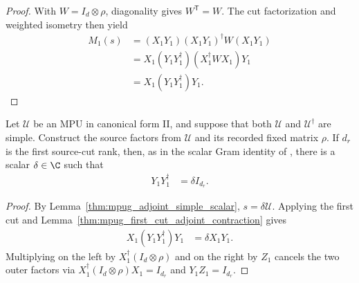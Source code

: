 \begin{proof}\leanok
    With $W=I_d\otimes\rho$, diagonality gives $W^{\mathsf T}=W$.
    The cut factorization and weighted isometry then yield
    \begin{align}
        M_1(s)
         & = (X_1Y_1)(X_1Y_1)^\dagger W(X_1Y_1)       \\
         & =X_1(Y_1Y_1^\dagger)(X_1^\dagger W X_1)Y_1 \\
         & =X_1(Y_1Y_1^\dagger)Y_1.
    \end{align}
\end{proof}

\begin{lemma}
    \label{thm:mpug_source_y_one_scalar_gram}
    \leanok
    Let $\mathcal U$ be an MPU in canonical form II, and suppose that
    both $\mathcal U$ and $\mathcal U^\dagger$ are simple. Construct the
    source factors from $\mathcal U$ and its recorded fixed matrix
    $\rho$. If $d_r$ is the first source-cut rank, then, as in the scalar
    Gram identity of \cite[lines~1375--1397]{FrancoRubio2025MPUGauging},
    there is a scalar $\delta\in\C$ such that
    \begin{align}
        Y_1Y_1^\dagger & =\delta I_{d_r}.
    \end{align}
\end{lemma}

\begin{proof}\leanok
    By Lemma~\ref{thm:mpug_adjoint_simple_scalar}, $s=\delta\mathcal U$.
    Applying the first cut and
    Lemma~\ref{thm:mpug_first_cut_adjoint_contraction} gives
    \begin{align}
        X_1(Y_1Y_1^\dagger)Y_1 & =\delta X_1Y_1.
    \end{align}
    Multiplying on the left by $X_1^\dagger(I_d\otimes\rho)$ and on the
    right by $Z_1$ cancels the two outer factors via
    $X_1^\dagger(I_d\otimes\rho)X_1=I_{d_r}$ and $Y_1Z_1=I_{d_r}$.
\end{proof}

